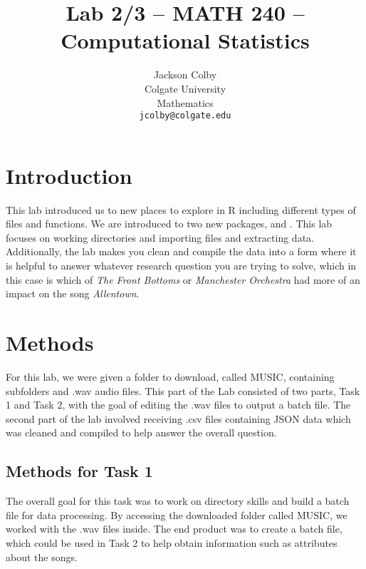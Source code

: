 \documentclass{article}\usepackage[]{graphicx}\usepackage[]{xcolor}
\begin{document}
\vspace{-1in}
\title{Lab 2/3 -- MATH 240 -- Computational Statistics}

\author{
  Jackson Colby \\
  Colgate University  \\
  Mathematics  \\
  {\tt jcolby@colgate.edu}
}

\date{}

\begin{multicols}{2}
\maketitle

\section{Introduction}
This lab introduced us to new places to explore in R including different types of files and functions. We are introduced to two new packages, \citep{stringr} and \citep{jsonlite}. This lab focuses on working directories and importing files and extracting data. Additionally, the lab makes you clean and compile the data into a form where it is helpful to answer whatever research question you are trying to solve, which in this case is which of \emph{The Front Bottoms} or \emph{Manchester Orchestra} had more of an impact on the song \emph{Allentown}.

\section{Methods}
For this lab, we were given a folder to download, called MUSIC, containing subfolders and .wav audio files. This part of the Lab consisted of two parts, Task 1 and Task 2, with the goal of editing the .wav files to output a batch file. The second part of the lab involved receiving .csv files containing JSON data which was cleaned and compiled to help answer the overall question.

\subsection{Methods for Task 1}
The overall goal for this task was to work on directory skills and build a batch file for data processing. By accessing the downloaded folder called MUSIC, we worked with the .wav files inside. The end product was to create a batch file, which could be used in Task 2 to help obtain information such as attributes about the songs.


\end{multicols}
\end{document}
